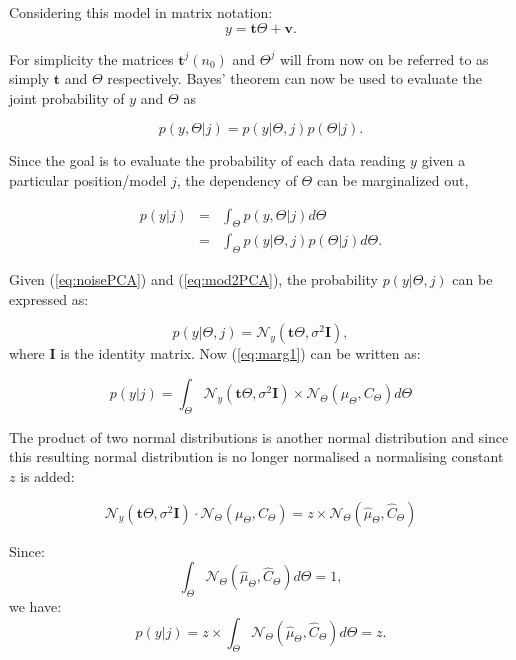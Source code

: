 Considering this model in matrix notation:
\begin{equation}\label{eq:mod2PCA}
y = \textbf{t}\Theta + \textbf{v}.
\end{equation}

For simplicity the matrices $\textbf{t}^j(n_0)$ and $\Theta^j$ will from now on be referred to as simply $\textbf{t}$ and $\Theta$ respectively.
Bayes' theorem can now be used to evaluate the joint probability of $y$ and $\Theta$ as

\begin{equation}\label{eq:bayes1}
p(y,\Theta | j) = p(y|\Theta,j)p(\Theta | j).
\end{equation}

Since the goal is to evaluate the probability of each data reading $y$ given a particular position/model $j$, the dependency of $\Theta$ can be marginalized out,

\begin{eqnarray}\nonumber
p(y|j) &=& \int_\Theta p(y,\Theta|j) d\Theta \\
\label{eq:marg1} &=& \int_\Theta p(y|\Theta,j)p(\Theta|j) d\Theta.
\end{eqnarray}

Given (\ref{eq:noisePCA}) and (\ref{eq:mod2PCA}), the probability $p(y|\Theta,j)$ can be expressed as:

\begin{equation}\label{eq:probybeta}
p(y|\Theta,j) = \mathcal{N}_y(\textbf{t}\Theta,\sigma^2\textbf{I}),
\end{equation}
where $\textbf{I}$ is the identity matrix.
Now (\ref{eq:marg1}) can be written as:

\begin{equation}\label{eq:marg2}
p(y|j) = \int_\Theta \mathcal{N}_y(\textbf{t}\Theta,\sigma^2 \textbf{I})\times\mathcal{N}_\Theta(\mu_\Theta,C_\Theta) d\Theta
\end{equation}

The product of two normal distributions is another normal distribution and since this resulting normal distribution is no longer normalised a normalising constant $z$ is added:

\begin{equation}\label{eq:prod1}
\mathcal{N}_y(\textbf{t}\Theta,\sigma^2 \textbf{I})\cdot\mathcal{N}_\Theta(\mu_\Theta,C_\Theta) = z \times \mathcal{N}_\Theta(\hat{\mu}_\Theta,\hat{C}_\Theta)
\end{equation}

Since:
\begin{equation}\label{eq:marg3}
\int_\Theta \mathcal{N}_\Theta(\hat{\mu}_\Theta,\hat{C}_\Theta) d\Theta = 1,
\end{equation}
we have:
\begin{equation}\label{eq:marg4}
p(y|j) = z \times \int_\Theta \mathcal{N}_\Theta(\hat{\mu}_\Theta,\hat{C}_\Theta) d\Theta = z.
\end{equation}

